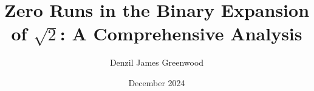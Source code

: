 

\title{Zero Runs in the Binary Expansion of $\sqrt{2}$: A Comprehensive Analysis}
\author{Denzil James Greenwood}
\date{December 2024}



\maketitle










